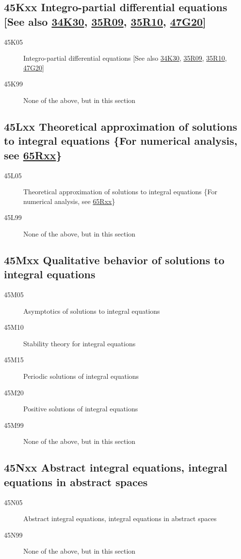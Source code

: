 \documentclass[letterpaper]{article}
\begin{document}
\subsection*{45Kxx  Integro-partial differential equations [See also \hyperref[34K30]{34K30}, \hyperref[35R09]{35R09}, \hyperref[35R10]{35R10}, \hyperref[47G20]{47G20}] }\label{45Kxx}
\begin{description}  
\item [45K05]\label{45K05} Integro-partial differential equations [See also \hyperref[34K30]{34K30}, \hyperref[35R09]{35R09}, \hyperref[35R10]{35R10}, \hyperref[47G20]{47G20}]
\item [45K99]\label{45K99} None of the above, but in this section
\end{description}
\subsection*{45Lxx  Theoretical approximation of solutions to integral equations \{For numerical analysis, see \hyperref[65Rxx]{65Rxx}\} }\label{45Lxx}
\begin{description}  
\item [45L05]\label{45L05} Theoretical approximation of solutions to integral equations \{For numerical analysis, see \hyperref[65Rxx]{65Rxx}\}
\item [45L99]\label{45L99} None of the above, but in this section
\end{description}
\subsection*{45Mxx  Qualitative behavior of solutions to integral equations}\label{45Mxx}
\begin{description}  
\item [45M05]\label{45M05} Asymptotics of solutions to integral equations
\item [45M10]\label{45M10} Stability theory  for integral equations
\item [45M15]\label{45M15} Periodic solutions of integral equations
\item [45M20]\label{45M20} Positive solutions of integral equations
\item [45M99]\label{45M99} None of the above, but in this section
\end{description}
\subsection*{45Nxx  Abstract integral equations, integral equations in abstract spaces }\label{45Nxx}
\begin{description}  
\item [45N05]\label{45N05} Abstract integral equations, integral equations in abstract spaces
\item [45N99]\label{45N99} None of the above, but in this section
\end{description}
\end{document}
